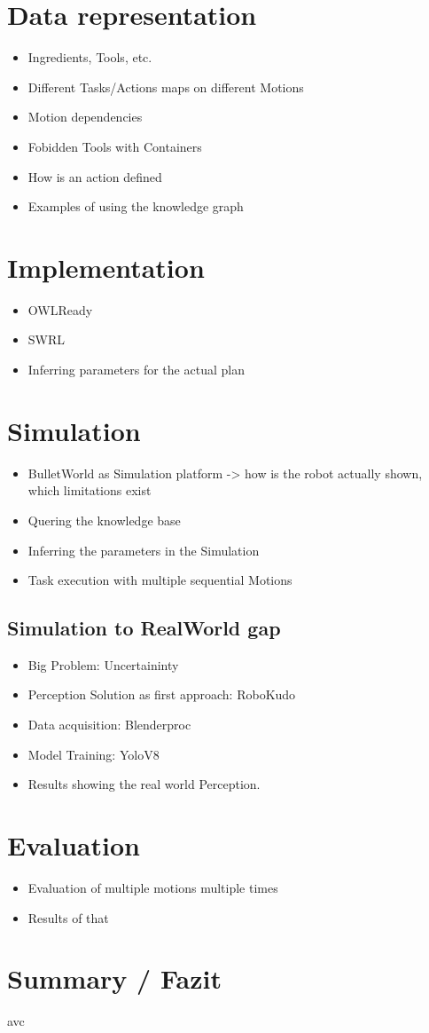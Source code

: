 \documentclass[	pdftex, 
								a4paper,
								11pt, DIV11, BCOR5mm,
								parskip,
								]{scrreprt}
\begin{document}
	\chapter*{Data representation}
	\begin{itemize}
		\item Ingredients, Tools, etc.
		\item Different Tasks/Actions maps on different Motions
		\item Motion dependencies
		\item Fobidden Tools with Containers
		\item How is an action defined
		\item Examples of using the knowledge graph
	\end{itemize}
	\chapter*{Implementation}
	\begin{itemize}
		\item OWLReady
		\item SWRL
		\item Inferring parameters for the actual plan
	\end{itemize}
	\chapter*{Simulation}
	\begin{itemize}
		\item BulletWorld as Simulation platform -> how is the robot actually shown, which limitations exist
		\item Quering the knowledge base
		\item Inferring the parameters in the Simulation
		\item Task execution with multiple sequential Motions
	\end{itemize}
	\section*{Simulation to RealWorld gap}
	\begin{itemize}
		\item Big Problem: Uncertaininty
		\item Perception Solution as first approach: RoboKudo
		\item Data acquisition: Blenderproc
		\item Model Training: YoloV8
		\item Results showing the real world Perception.
	\end{itemize}
	\chapter*{Evaluation}
	\begin{itemize}
		\item Evaluation of multiple motions multiple times
		\item Results of that
	\end{itemize}
	\chapter*{Summary / Fazit}
avc
\end{document}
